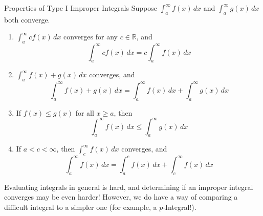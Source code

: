 \begin{Theorem}{Properties of Type I Improper Integrals}{}
    Suppose $ \displaystyle \int_{a}^{\infty} f(x)\, d{x}  $ and
    $ \displaystyle \int_{a}^{\infty} g(x)\, d{x}  $
    both converge.
    \begin{enumerate}[label=(\arabic*)]
        \item $ \displaystyle \int_{a}^{\infty} cf(x)\, d{x} $
              converges for any $ c\in\mathbb{R} $, and
              \[ \int_{a}^{\infty} cf(x)\, d{x} =c \int_{a}^{\infty} f(x)\, d{x} \]
        \item $ \displaystyle \int_{a}^{\infty} f(x)+g(x)\, d{x} $
              converges, and
              \[ \int_{a}^{\infty} f(x)+g(x)\, d{x}=
                  \int_{a}^{\infty} f(x)\, d{x} +\int_{a}^{\infty} g(x)\, d{x} \]
        \item If $ f(x)\leqslant g(x) $ for all $ x\geqslant a $, then
              \[ \int_{a}^{\infty} f(x)\, d{x} \leqslant \int_{a}^{\infty} g(x)\, d{x} \]
        \item If $ a<c<\infty $, then $ \int_{c}^{\infty} f(x)\, d{x} $ converges, and
              \[ \int_{a}^{\infty} f(x)\, d{x}=
                  \int_{a}^{c} f(x)\, d{x} +\int_{c}^{\infty} f(x)\, d{x} \]
    \end{enumerate}
\end{Theorem}
Evaluating integrals in general is hard, and determining if an improper integral converges
may be even harder! However, we do have a way of comparing a difficult
integral to a simpler one (for example, a $ p $-Integral!).

